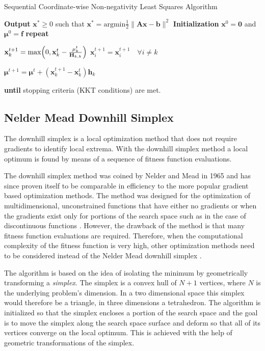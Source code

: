\documentclass[11pt,a4paper,twoside]{report}
\begin{document}
\begin{algorithm}\label{a:sca}
\caption{Sequential Coordinate-wise Non-negativity Least Squares Algorithm}
\begin{algorithmic}[1]
\State \textbf{Output} $\mathbf{x^*} \ge 0$ such that $\mathbf{x^*} =
\mathrm{argmin} \frac{1}{2}\lVert \mathbf{Ax - b} \rVert^2$
\State \textbf{Initialization} $\mathbf{x}^0 = \mathbf{0}$ and $\mathbf{\mu}^0 =
\mathbf{f}$
\State \textbf{repeat}

\State $\mathbf{x}_k^{t+1} = \mathrm{max} \Bigr(0,\mathbf{x}_k^t -
\frac{\mathbf{\mu}_k^t}{\mathbf{H}_{k,k}} \Bigl)$
\State $ \mathbf{x}_i^{t+1} = \mathbf{x}_i^{t+1} \quad \forall i \ne k$

\State $\mathbf{\mu}^{t+1} = \mathbf{\mu}^t + (\mathbf{x}_k^{t+1} - \mathbf{x}_k^t)\mathbf{h}_k$

\EndFor

\State \textbf{until} stopping criteria (KKT conditions) are met.
\EndProcedure
\end{algorithmic}
\end{algorithm}



\subsection{Nelder Mead Downhill Simplex}\label{s:nelder}

The downhill simplex is a local optimization method that does not
require gradients to identify local extrema. With the downhill simplex method a
local optimum is found by means of a sequence of fitness function evaluations.

The downhill simplex method was coined by Nelder and Mead in 1965
and has since proven itself to be comparable in efficiency to the more popular 
gradient based optimization methods. The method was designed
for the optimization of multidimensional, unconstrained functions
that have either no gradients or when the gradients exist only for
portions of the search space such as in the case of discontinuous functions
\cite{Nelder2009}. However, the drawback of the method is that many fitness function evaluations
are required. Therefore, when the computational complexity of the
fitness function is very high, other optimization methods need to
be considered instead of the Nelder Mead downhill simplex \cite{Press1992}.

The algorithm is based on the idea of isolating the
minimum by geometrically transforming a \textit{simplex}. The simplex
is a convex hull of $N+1$ vertices, where $N$ is the underlying
problem's dimension. In a two dimensional space this simplex would therefore
be a triangle, in three dimensions a tetrahedron. The algorithm is initialized
so that the simplex encloses
a portion of the search space and the goal is to move the simplex along the
search space surface and deform so that all of its vertices converge on the local optimum. This is achieved with
the help of geometric transformations of the simplex.
\end{document}

